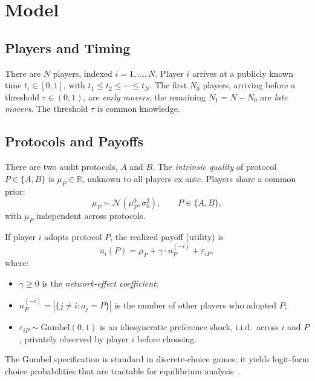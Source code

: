 \documentclass[12pt,a4paper]{article}
\newcommand{\R}{\mathbb{R}}
\begin{document}
\section{Model}

\subsection{Players and Timing}

There are $N$ players, indexed $i=1,\dots,N$.  Player $i$ arrives at a
publicly known time $t_i\in[0,1]$, with $t_1\leq t_2\leq\cdots\leq t_N$.
The first $N_0$ players, arriving before a threshold $\tau\in(0,1)$, are
\emph{early movers}; the remaining $N_1=N-N_0$ are \emph{late movers}.
The threshold $\tau$ is common knowledge.

\subsection{Protocols and Payoffs}

There are two audit protocols, $A$ and $B$.  The \emph{intrinsic quality}
of protocol $P\in\{A,B\}$ is $\mu_P\in\R$, unknown to all players ex ante.
Players share a common prior:
\begin{equation}\label{eq:prior}
    \mu_P \sim \mathcal{N}(\mu_P^0, \sigma_0^2),\qquad P\in\{A,B\},
\end{equation}
with $\mu_P$ independent across protocols.

\medskip\noindent
If player $i$ adopts protocol $P$, the realized payoff (utility) is
\begin{equation}\label{eq:payoff}
    u_i(P) = \mu_P + \gamma\cdot n_P^{(-i)} + \varepsilon_{iP},
\end{equation}
where:
\begin{itemize}[nosep]
    \item $\gamma\geq0$ is the \emph{network-effect coefficient};
    \item $n_P^{(-i)} = |\{j\neq i: a_j = P\}|$ is the number of other
          players who adopted $P$;
    \item $\varepsilon_{iP}\sim\text{Gumbel}(0,1)$ is an idiosyncratic
          preference shock, i.i.d.\ across $i$ and $P$, privately observed
          by player $i$ before choosing.
\end{itemize}
The Gumbel specification is standard in discrete-choice games; it yields
logit-form choice probabilities that are tractable for equilibrium
analysis~\citep{mcfadden1974conditional}.
\end{document}
